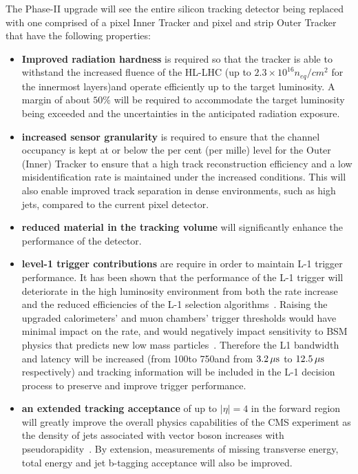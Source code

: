 The Phase-II upgrade will see the entire silicon tracking detector being replaced with one comprised of a pixel Inner Tracker and pixel and strip Outer Tracker that have the following properties:
\begin{itemize}
\item \textbf{Improved radiation hardness} is required so that the tracker is able to withstand the increased fluence of the HL-LHC (up to $2.3\times10^{16} n_{eq}/cm^{2}$ for the innermost layers)and operate efficiently up to the target luminosity. A margin of about $50\%$ will be required to accommodate the target luminosity being exceeded and the uncertainties in the anticipated radiation exposure.
\item \textbf{increased sensor granularity} is required to ensure that the channel occupancy is kept at or below the per cent (per mille) level for the Outer (Inner) Tracker to ensure that a high track reconstruction efficiency and a low misidentification rate is maintained under the increased \PU conditions. This will also enable improved track separation in dense environments, such as high \pT jets, compared to the current pixel detector.
\item \textbf{reduced material in the tracking volume} will significantly enhance the performance of the detector.
\item \textbf{level-1 trigger contributions} are require in order to maintain L-1 trigger performance. It has been shown that the performance of the L-1 trigger will deteriorate in the high luminosity environment from both the rate increase and the reduced efficiencies of the L-1 selection algorithms~\cite{CMSCollaboration:2015zni}.
Raising the upgraded calorimeters' and muon chambers' trigger thresholds would have minimal impact on the rate, and would negatively impact sensitivity to BSM physics that predicts new low mass particles~\cite{CMSCollaboration:2015zni}.
Therefore the L1 bandwidth and latency will be increased (from 100\kHz to 750\kHz and from $3.2\,\mu\text{s}$ to $12.5\,\mu\text{s}$ respectively) and tracking information will be included in the L-1 decision process to preserve and improve trigger performance.
\item \textbf{an extended tracking acceptance} of  up to $|\eta| = 4$ in the forward region will greatly improve the overall physics capabilities of the CMS experiment as the density of jets associated with vector boson increases with pseudorapidity~\cite{CMS_Upgrade_TP}. By extension, measurements of missing transverse energy, total energy and jet b-tagging acceptance will also be improved.
\end{itemize}

